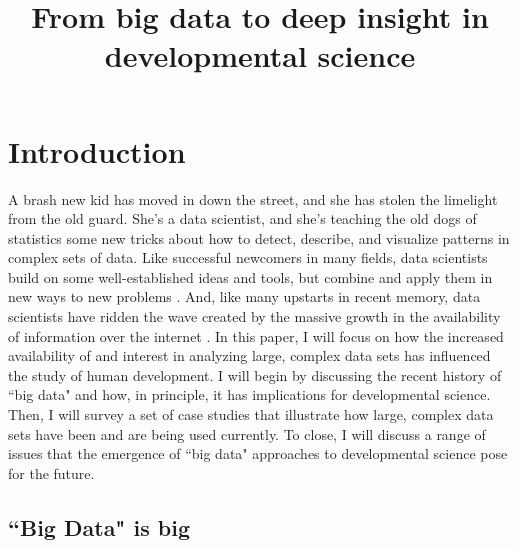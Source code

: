 \documentclass[letterpaper,man,apacite]{apa6}
\title{From big data to deep insight in developmental science}
\begin{document}
\maketitle

\section{Introduction}

A brash new kid has moved in down the street, and she has stolen the limelight from the old guard.
She's a data scientist, and she's teaching the old dogs of statistics some new tricks about how to detect, describe, and visualize patterns in complex sets of data.
Like successful newcomers in many fields, data scientists build on some well-established ideas and tools, but combine and apply them in new ways to new problems \cite{Press2013b}.
And, like many upstarts in recent memory, data scientists have ridden the wave created by the massive growth in the availability of information over the internet \cite{Borgmann2015}.
In this paper, I will focus on how the increased availability of and interest in analyzing large, complex data sets has influenced the study of human development.
I will begin by discussing the recent history of ``big data" and how, in principle, it has implications for developmental science.
Then, I will survey a set of case studies that illustrate how large, complex data sets have been and are being used currently.
To close, I will discuss a range of issues that the emergence of ``big data" approaches to developmental science pose for the future.

\subsection{``Big Data" is big}
\end{document}
